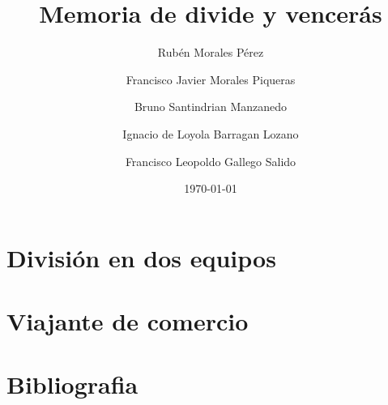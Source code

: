 \documentclass[11pt,spanish]{article} %
\title{Memoria de divide y vencerás}
\author{Rubén Morales Pérez
		\and Francisco Javier Morales Piqueras
		\and Bruno Santindrian Manzanedo
		\and Ignacio de Loyola Barragan Lozano
		\and Francisco Leopoldo Gallego Salido}
\date{\today}
\begin{document}
\maketitle
\tableofcontents %
\newpage
\setlength\parindent{0pt} %

\section{División en dos equipos}


\newpage
\section{Viajante de comercio}



\section{Bibliografia}
%
\newpage
\end{document}

